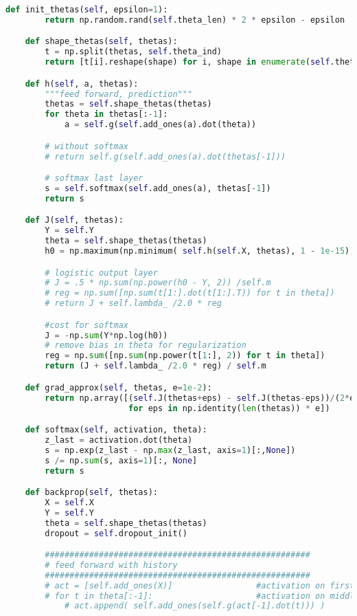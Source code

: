 \documentclass[a4paper,11pt]{article}
\begin{document}
\begin{lstlisting}[language=Python]
    def init_thetas(self, epsilon=1):
        return np.random.rand(self.theta_len) * 2 * epsilon - epsilon

    def shape_thetas(self, thetas):
        t = np.split(thetas, self.theta_ind)
        return [t[i].reshape(shape) for i, shape in enumerate(self.theta_shape)]

    def h(self, a, thetas):
        """feed forward, prediction"""
        thetas = self.shape_thetas(thetas)
        for theta in thetas[:-1]:
            a = self.g(self.add_ones(a).dot(theta))

        # without softmax
        # return self.g(self.add_ones(a).dot(thetas[-1]))

        # softmax last layer
        s = self.softmax(self.add_ones(a), thetas[-1])
        return s

    def J(self, thetas):
        Y = self.Y
        theta = self.shape_thetas(thetas)
        h0 = np.maximum(np.minimum( self.h(self.X, thetas), 1 - 1e-15), 1e-15)

        # logistic output layer
        # J = .5 * np.sum(np.power(h0 - Y, 2)) /self.m
        # reg = np.sum([np.sum(t[1:].dot(t[1:].T)) for t in theta])
        # return J + self.lambda_ /2.0 * reg

        #cost for softmax
        J = -np.sum(Y*np.log(h0))
        # remove bias in theta for regularization
        reg = np.sum([np.sum(np.power(t[1:], 2)) for t in theta])
        return (J + self.lambda_ /2.0 * reg) / self.m

    def grad_approx(self, thetas, e=1e-2):
        return np.array([(self.J(thetas+eps) - self.J(thetas-eps))/(2*e)
                         for eps in np.identity(len(thetas)) * e])

    def softmax(self, activation, theta):
        z_last = activation.dot(theta)
        s = np.exp(z_last - np.max(z_last, axis=1)[:,None])
        s /= np.sum(s, axis=1)[:, None]
        return s

    def backprop(self, thetas):
        X = self.X
        Y = self.Y
        theta = self.shape_thetas(thetas)
        dropout = self.dropout_init()

        ######################################################
        # feed forward with history
        ######################################################
        # act = [self.add_ones(X)]                 #activation on first layer (a1)
        # for t in theta[:-1]:                     #activation on middle layers
            # act.append( self.add_ones(self.g(act[-1].dot(t))) )


\end{lstlisting}
\end{document}
